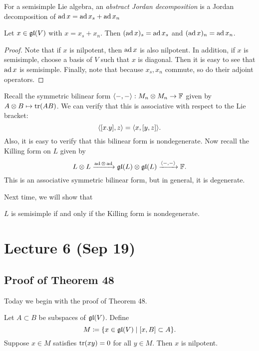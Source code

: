 \documentclass[twoside, 10pt]{article}
\newcommand{\F}{\mathbb{F}}
\begin{document}
    \begin{defn} For a semisimple Lie algebra, an \textit{abstract Jordan
    decomposition} is a Jordan decomposition of $\operatorname{ad} x = \operatorname{ad} x_s + \operatorname{ad} x_n$
\end{defn}

    \begin{cor} Let $x \in \mathfrak{gl}(V)$ with $x=x_s+x_n$. Then $(\operatorname{ad} x)_s = \operatorname{ad}
    x_s$ and $(\operatorname{ad} x)_n = \operatorname{ad} x_n$.  \end{cor}

    \begin{proof} Note that if $x$ is nilpotent, then $\operatorname{ad} x$ is also
        nilpotent. In addition, if $x$ is semisimple, choose a basis of $V$
        such that $x$ is diagonal. Then it is easy to see that $\operatorname{ad} x$ is
        semisimple. Finally, note that because $x_s,x_n$ commute, so do their
        adjoint operators.  \end{proof}

    Recall the symmetric bilinear form $\gen{-,-}: M_n \otimes M_n \to \F$
    given by $A \otimes B \mapsto \operatorname{tr}(AB)$. We can verify that this is
    associative with respect to the Lie bracket: \[\langle[x.y],z\rangle =
        \langle x,[y,z]\rangle.\] Also, it is easy to verify that this bilinear form is
        nondegenerate. Now recall the Killing form on $L$ given by \[L \otimes
        L \xrightarrow{\ad \otimes \ad} \mf{gl}(L) \otimes \mf{gl}(L)
    \xrightarrow{\gen{-,-}} \F.\] This is an associative symmetric bilinear
    form, but in general, it is degenerate.
    
    Next time, we will show that

    \begin{thm} $L$ is semisimple if and only if the Killing form is
    nondegenerate.  \end{thm}

    \section{Lecture 6 (Sep 19)}%
    
    \subsection{Proof of Theorem 48}%

    Today we begin with the proof of Theorem 48.

    \begin{lem} Let $A \subset B$ be subspaces of $\mathfrak{gl}(V)$. Define \[ M
    \coloneqq \{ x \in \mathfrak{gl}(V) \mid [x,B] \subset A\}.\] Suppose $x \in M$
satisfies $\operatorname{tr}(xy) = 0$ for all $y \in M$. Then $x$ is nilpotent.  \end{lem}
\end{document}
